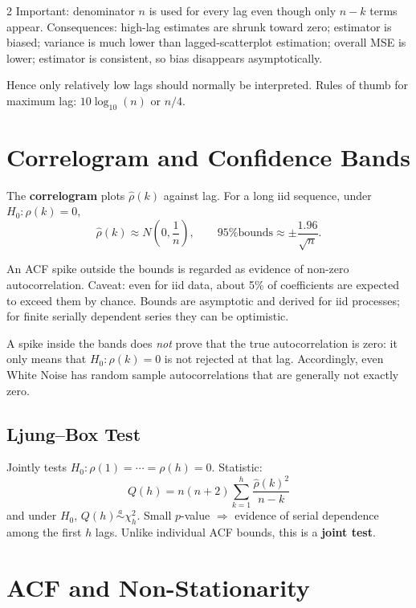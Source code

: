 \documentclass[9pt,a4paper]{extarticle}
\newcommand{\key}[1]{\textbf{#1}}
\begin{document}
\begin{multicols}{2}
Important: denominator \(n\) is used for every lag even though only \(n-k\) terms appear. Consequences: high-lag estimates are shrunk toward zero; estimator is biased; variance is much lower than lagged-scatterplot estimation; overall MSE is lower; estimator is consistent, so bias disappears asymptotically.

Hence only relatively low lags should normally be interpreted. Rules of thumb for maximum lag: \(10\log_{10}(n)\) or \(n/4\).

\section{Correlogram and Confidence Bands}

The \key{correlogram} plots \(\widehat\rho(k)\) against lag. For a long iid sequence, under \(H_0:\rho(k)=0\),
\[
\widehat\rho(k)\approx N\!\left(0,\frac1n\right),
\qquad
\boxed{\text{95\% bounds}\approx\pm\frac{1.96}{\sqrt n}}.
\]

An ACF spike outside the bounds is regarded as evidence of non-zero autocorrelation. Caveat: even for iid data, about 5\% of coefficients are expected to exceed them by chance. Bounds are asymptotic and derived for iid processes; for finite serially dependent series they can be optimistic.

A spike inside the bands does \emph{not} prove that the true autocorrelation is zero: it only means that \(H_0:\rho(k)=0\) is not rejected at that lag. Accordingly, even White Noise has random sample autocorrelations that are generally not exactly zero.

\subsection{Ljung--Box Test}

Jointly tests
\(H_0:\rho(1)=\cdots=\rho(h)=0\). Statistic:
\[
\boxed{
Q(h)=n(n+2)\sum_{k=1}^{h}\frac{\widehat\rho(k)^2}{n-k}
}
\]
and under \(H_0\), \(Q(h)\overset a\sim\chi_h^2\). Small \(p\)-value \(\Rightarrow\) evidence of serial dependence among the first \(h\) lags. Unlike individual ACF bounds, this is a \key{joint test}.

\section{ACF and Non-Stationarity}


\end{multicols}
\end{document}
